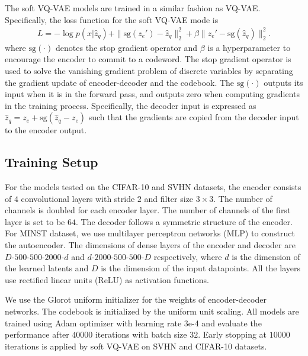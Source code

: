 \documentclass[letterpaper]{article} %
\begin{document}
The soft VQ-VAE models are trained in a similar fashion as VQ-VAE. Specifically, the loss function for the soft VQ-VAE mode is
\begin{equation}
\label{eq:loss1}
\begin{split}
L = -\log p(x|\hat{z}_q)+ \|\text{sg}\left(z_e'\right)-\hat{z}_q\|_2^2 + \beta\|z_e'- \text{sg}(\hat{z}_q)\|_2^2.
\end{split}
\end{equation}
where $\text{sg}(\cdot)$ denotes the stop gradient operator and $\beta$ is a hyperparameter to encourage the encoder to commit to a codeword. The stop gradient operator is used to solve the vanishing gradient problem of discrete variables by separating the gradient update of encoder-decoder and the codebook.
The $\text{sg}(\cdot)$ outputs its input when it is in the
forward pass, and outputs zero when computing gradients in the training process.
Specifically, the decoder input is expressed as $\hat{z}_q = z_e + \text{sg}(\hat{z}_q-z_e)$ such that the gradients are copied from the decoder input to the encoder output.
\subsection{Training Setup}
For the models tested on the CIFAR-10 and SVHN datasets, the encoder consists of $4$ convolutional layers with stride $2$ and filter size $3 \times 3$. The number of channels is doubled for each encoder layer. The number of channels of the first layer is set to be $64$. The decoder follows a symmetric structure of the encoder. For MINST dataset, we use multilayer perceptron networks (MLP) to construct the autoencoder. The dimensions of dense layers of the encoder and decoder are $D$-$500$-$500$-$2000$-$d$ and $d$-$2000$-$500$-$500$-$D$ respectively, where $d$ is the dimension of the learned latents and $D$ is the dimension of the input datapoints. All the layers use rectified linear units (ReLU) as activation functions.

We use the Glorot uniform initializer \cite{pmlr-v9-glorot10a} for the weights of encoder-decoder networks. The codebook is initialized by the uniform unit scaling. All models are trained using Adam optimizer \cite{kingma:15:iclr} with learning rate 3e-4 and evaluate the performance after $40000$ iterations with batch size $32$. Early stopping at $10000$ iterations is applied by soft VQ-VAE on SVHN and CIFAR-10 datasets.
\end{document}
